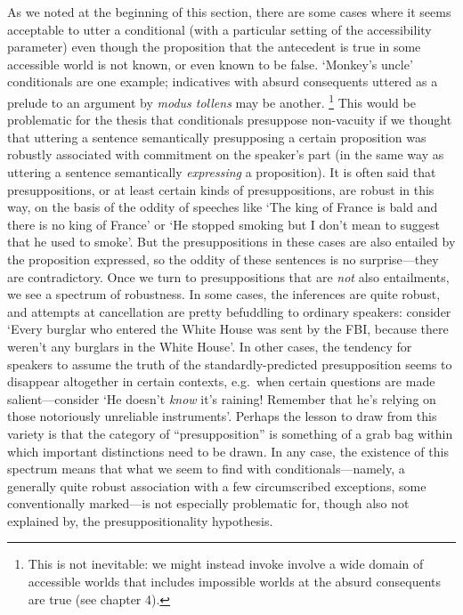 \documentclass[If.tex]{subfiles}
\begin{document}
As we noted at the beginning of this section, there are some cases where it seems acceptable to utter a conditional (with a particular setting of the accessibility parameter) even though the proposition that the antecedent is true in some accessible world is not known, or even known to be false.  ‘Monkey's uncle’ conditionals are one example; indicatives with absurd consequents uttered as a prelude to an argument by \emph{modus tollens} may be another.%
\footnote{This is not inevitable: we might instead invoke involve a wide domain of accessible worlds that includes impossible worlds at the absurd consequents are true (see chapter 4).}
This would be problematic for the thesis that conditionals presuppose non-vacuity if we thought that uttering a sentence semantically presupposing a certain proposition was robustly associated with commitment on the speaker's part (in the same way as uttering a sentence semantically \emph{expressing} a proposition).  It is often said that presuppositions, or at least certain kinds of presuppositions, are robust in this way, on the basis of the oddity of speeches like ‘The king of France is bald and there is no king of France’ or ‘He stopped smoking but I don't mean to suggest that he used to smoke’.  But the presuppositions in these cases are also entailed by the proposition expressed, so the oddity of these sentences is no surprise---they are contradictory.  Once we turn to presuppositions that are \emph{not} also entailments, we see a spectrum of robustness.  In some cases, the inferences are quite robust, and attempts at cancellation are pretty befuddling to ordinary speakers: consider ‘Every burglar who entered the White House was sent by the FBI, because there weren't any burglars in the White House’.  In other cases, the tendency for speakers to assume the truth of the standardly-predicted presupposition seems to disappear altogether in certain contexts, e.g.\ when certain questions are made salient---consider ‘He doesn't \emph{know} it's raining!  Remember that he's relying on those notoriously unreliable instruments’.  Perhaps the lesson to draw from this variety is that the category of “presupposition” is something of a grab bag within which important distinctions need to be drawn.  In any case, the existence of this spectrum means that what we seem to find with conditionals---namely, a generally quite robust association with a few circumscribed exceptions, some conventionally marked---is not especially problematic for, though also not explained by, the presuppositionality hypothesis.  
\end{document}
